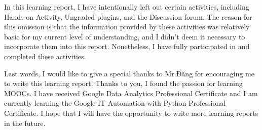 \documentclass[]{article}
\begin{document}
In this learning report, I have intentionally left out certain activities, including Hands-on Activity, Ungraded plugins, and the Discussion forum. The reason for this omission is that the information provided by these activities was relatively basic for my current level of understanding, and I didn't deem it necessary to incorporate them into this report. Nonetheless, I have fully participated in and completed these activities.

Last words, I would like to give a special thanks to Mr.Đăng for encouraging me to write this learning report. Thanks to you, I found the passion for learning MOOCs. I have received Google Data Analytics Professional Certificate and I am currently learning the Google IT Automation with Python Professional Certificate. I hope that I will have the opportunity to write more learning reports in the future.
\end{document}
